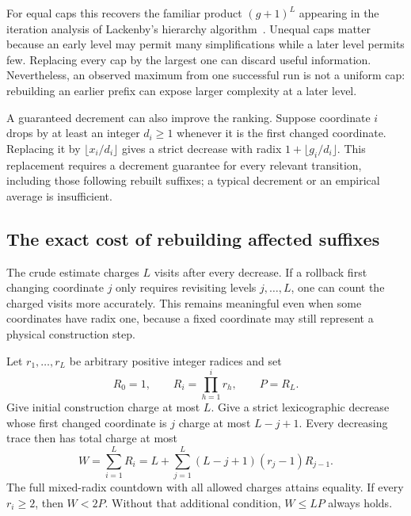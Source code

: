 For equal caps this recovers the familiar product $(g+1)^L$ appearing in the
iteration analysis of Lackenby's hierarchy algorithm~\cite{lackenby2026}.
Unequal caps matter because an early level may permit many simplifications
while a later level permits few.  Replacing every cap by the largest one can
discard useful information.  Nevertheless, an observed maximum from one
successful run is not a uniform cap: rebuilding an earlier prefix can expose
larger complexity at a later level.

A guaranteed decrement can also improve the ranking.  Suppose coordinate $i$
drops by at least an integer $d_i\geq1$ whenever it is the first changed
coordinate.  Replacing it by $\lfloor x_i/d_i\rfloor$ gives a strict decrease
with radix $1+\lfloor g_i/d_i\rfloor$.  This replacement requires a decrement
guarantee for every relevant transition, including those following rebuilt
suffixes; a typical decrement or an empirical average is insufficient.

\subsection{The exact cost of rebuilding affected suffixes}

The crude estimate charges $L$ visits after every decrease.  If a rollback
first changing coordinate $j$ only requires revisiting levels $j,\ldots,L$,
one can count the charged visits more accurately.  This remains meaningful
even when some coordinates have radix one, because a fixed coordinate may
still represent a physical construction step.

\begin{theorem}
\label{thm:suffix-budget}
Let $r_1,\ldots,r_L$ be arbitrary positive integer radices and set
\[
 R_0=1,\qquad R_i=\prod_{h=1}^i r_h,\qquad P=R_L.
\]
Give initial construction charge at most $L$.  Give a strict lexicographic
decrease whose first changed coordinate is $j$ charge at most $L-j+1$.
Every decreasing trace then has total charge at most
\begin{equation}
 W=\sum_{i=1}^L R_i
  =L+\sum_{j=1}^L(L-j+1)(r_j-1)R_{j-1}.
 \label{eq:exact-suffix-budget}
\end{equation}
The full mixed-radix countdown with all allowed charges attains equality.
If every $r_i\geq2$, then $W<2P$.  Without that additional condition,
$W\leq LP$ always holds.
\end{theorem}

